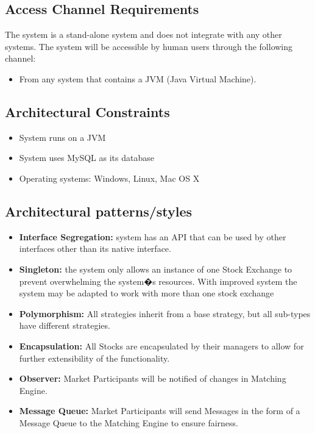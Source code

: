 \documentclass[12pt]{article}
\begin{document}
                            \subsection{Access Channel Requirements}
                                 The system is a stand-alone system and does not integrate with any other systems.
                                 The system will be accessible by human users through the following channel:
                                         \begin{itemize}
                                             \item From any system that contains a JVM (Java Virtual Machine).
                                         \end{itemize}
			   			
                            \subsection{Architectural Constraints}	
                                    \begin{itemize}
                                            \item System runs on a JVM
                                            \item System uses MySQL as its database
                                            \item Operating systems: Windows, Linux, Mac OS X
                                    \end{itemize}						    	    
		\subsection{Architectural patterns/styles}
                                \begin{itemize}
                                    \item \textbf{Interface Segregation:} system has an API that can be used by other interfaces other than its native interface.
                                    \item \textbf{Singleton:} the system only allows an instance of one Stock Exchange to prevent overwhelming the system�s resources. With improved system the system may be adapted to work with more than one stock exchange
                                    \item \textbf{Polymorphism:} All strategies inherit from a base strategy, but all sub-types have different strategies.
                                    \item \textbf{Encapsulation:} All Stocks are encapsulated by their managers to allow for further extensibility of the functionality.
                                    \item \textbf{Observer:} Market Participants will be notified of changes in Matching Engine. 
                                    \item \textbf{Message Queue:} Market Participants will send Messages in the form of a Message Queue to the Matching Engine to ensure fairness.
                                \end{itemize}
\end{document}
